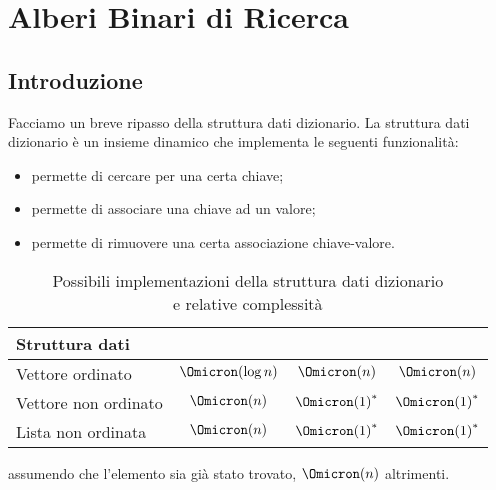 
\ifsubfile
\usepackage{../settings/subfile}
\setcounter{chapter}{6}


\fi
\chapter{Alberi Binari di Ricerca}

\section{Introduzione}

Facciamo un breve ripasso della struttura dati dizionario.
La struttura dati dizionario è un insieme dinamico che implementa le seguenti funzionalità:
\begin{itemize}
	\item \Item {} permette di cercare per una certa chiave;
	\item {} permette di associare una chiave ad un valore;
	\item {} permette di rimuovere una certa associazione chiave-valore.
\end{itemize}

\begin{table}[H]
	\centering
	\caption{Possibili implementazioni della struttura dati dizionario\\e relative complessità}
	\label{tab:complessita-implementazioni-dizionario}
	\begin{tabular}{@{} l *{3}{c} @{}}
	\toprule
		Struttura dati & \dictLookup & \dictInsert & \dictRemove\\
	\midrule
	Vettore ordinato & \(\Omicron(\log n)\) & \(\Omicron(n)\) & \(\Omicron(n)\)\\
	Vettore non ordinato & \(\Omicron(n)\) & \({\Omicron(1)}^{*}\) & \({\Omicron(1)}^{*}\)\\
	Lista non ordinata & \(\Omicron(n)\) & \({\Omicron(1)}^{*}\) & \({\Omicron(1)}^{*}\)\\
	\bottomrule
	\end{tabular}

	\smallskip
	{\small	* assumendo che l'elemento sia già stato trovato, \(\Omicron(n)\) altrimenti.}
\end{table}

